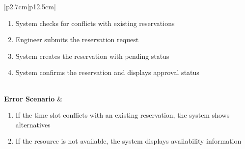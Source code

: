 \begin{table}[H]
\begin{tabular}{|p{2.7cm}|p{12.5cm}|}
\begin{minipage}[t]{\linewidth}
\begin{enumerate}[topsep=0pt,itemsep=1pt,parsep=0pt,partopsep=0pt]
                                              \item System checks for conflicts with existing reservations
                                              \item Engineer submits the reservation request
                                              \item System creates the reservation with pending status
                                              \item System confirms the reservation and displays approval status
                                          \end{enumerate}
                                      \end{minipage}                   \\
            \hline
            \textbf{Error Scenario} & \begin{minipage}[t]{\linewidth}
                                          \begin{enumerate}[topsep=0pt,itemsep=1pt,parsep=0pt,partopsep=0pt]
                                              \item If the time slot conflicts with an existing reservation, the system shows
                                                    alternatives
                                              \item If the resource is not available, the system displays availability information
                                          \end{enumerate}
                                      \end{minipage} \\
            \hline
        \end{tabular}
        \label{tab:eng-create-reservation}
    \end{table}
